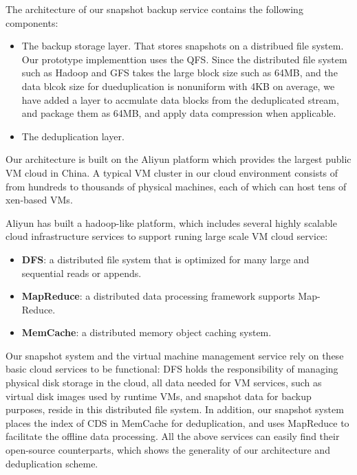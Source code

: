 The architecture of our snapshot backup service contains the following components:
\begin{itemize}

\item  The backup storage layer. 
That stores snapshots on a distribued file system. 
Our prototype implementtion uses the QFS.
Since the distributed file system such as Hadoop and GFS takes the large block size such as 64MB,
and the data blcok size for dueduplication is nonuniform with 4KB on average,
we have added a layer to accmulate  data blocks from the deduplicated stream, and 
package them as 64MB, and apply data compression when applicable.

\item The deduplication layer.

\end{itemize}

Our architecture is built on the Aliyun platform which provides the largest public VM cloud in China. 
A typical VM cluster in our cloud environment
consists of from hundreds to thousands of physical machines, each of which can
host tens of xen-based\cite{Barham2003} VMs.

Aliyun has built a hadoop-like platform, which includes
several highly scalable cloud infrastructure services to support
 runing large scale VM cloud service:
\begin{itemize}
\item \textbf{DFS}: a distributed file system that is optimized for many large and sequential reads or appends.
\item \textbf{MapReduce}: a distributed data processing framework supports Map-Reduce\cite{Dean2004}.
\item \textbf{MemCache}: a distributed memory object caching system.
\end{itemize}
Our snapshot system and the virtual machine management service rely on these basic cloud services
to be functional:
DFS holds the responsibility of managing physical disk storage
in the cloud, all data needed for VM services, such as virtual disk images used by runtime VMs,
and snapshot data for backup purposes, reside in this distributed file system. 
In addition, our snapshot system 
places the index of CDS in MemCache for deduplication, 
and uses MapReduce to facilitate the offline
data processing. All the above services can easily find their open-source counterparts,
which shows the generality of our architecture and deduplication scheme.

